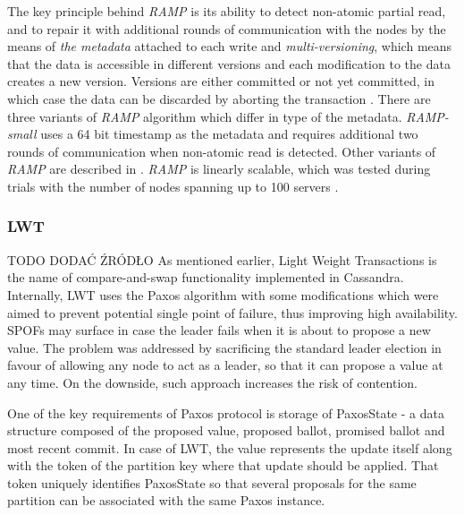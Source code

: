 The key principle behind \emph{RAMP} is its ability to detect non-atomic partial read, and to repair it with additional rounds of communication with the nodes by the means of \emph{the metadata} attached to each write and \emph{multi-versioning}, which means that the data is accessible in different versions and each modification to the data creates a new version. Versions are either committed or not yet committed, in which case the data can be discarded by aborting the transaction \cite[p. 6]{Bailis:2014}. 
There are three variants of \emph{RAMP} algorithm which differ in type of the metadata. \emph{RAMP-small} uses a 64 bit timestamp as the metadata and requires additional two rounds of communication when non-atomic read is detected. Other variants of \emph{RAMP} are described in \cite[p. 5]{Bailis:2014}.
\emph{RAMP} is linearly scalable, which was tested during trials with the number of nodes spanning up to 100 servers \cite[p. 10]{Bailis:2014}.

%

\subsubsection{LWT}\label{sec:theory:transactions:lwt}
TODO DODAĆ ŹRÓDŁO
As mentioned earlier, Light Weight Transactions is the name of compare-and-swap functionality implemented in Cassandra. Internally, LWT uses the Paxos algorithm with some modifications which were aimed to prevent potential single point of failure, thus improving high availability. SPOFs may surface in case the leader fails when it is about to propose a new value. The problem was addressed by sacrificing the standard leader election in favour of allowing any node to act as a leader, so that it can propose a value at any time. On the downside, such approach increases the risk of contention. 

One of the key requirements of Paxos protocol is storage of PaxosState - a data structure composed of the proposed value, proposed ballot, promised ballot and most recent commit. In case of LWT, the value represents the update itself along with the token of the partition key where that update should be applied. That token uniquely identifies PaxosState so that several proposals for the same partition can be associated with the same Paxos instance. 


